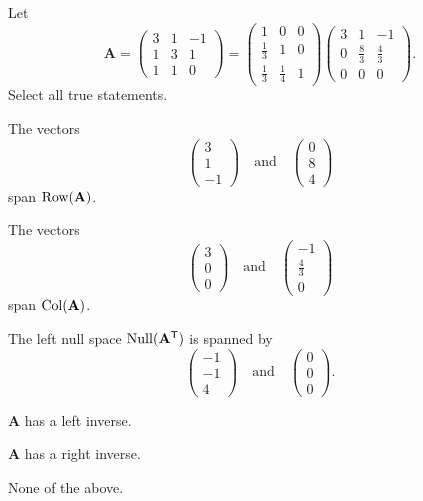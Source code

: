 \begin{problem}
Let
\[
\mathbf A=
\begin{pmatrix}
3&1&-1\\
1&3&1\\
1&1&0
\end{pmatrix}
=
\begin{pmatrix}
1&0&0\\
\frac13&1&0\\
\frac13&\frac14&1
\end{pmatrix}
\begin{pmatrix}
3&1&-1\\
0&\frac83&\frac43\\
0&0&0
\end{pmatrix}.
\]
Select all true statements.
\begin{problemchoices}
\item The vectors
\[
\begin{pmatrix}3\\1\\-1\end{pmatrix}
\quad\text{and}\quad
\begin{pmatrix}0\\8\\4\end{pmatrix}
\]
span $\operatorname{Row}(\mathbf A)$.
\item The vectors
\[
\begin{pmatrix}3\\0\\0\end{pmatrix}
\quad\text{and}\quad
\begin{pmatrix}-1\\\frac43\\0\end{pmatrix}
\]
span $\operatorname{Col}(\mathbf A)$.
\item The left null space $\operatorname{Null}(\mathbf A^{\mathsf T})$ is spanned by
\[
\begin{pmatrix}-1\\-1\\4\end{pmatrix}
\quad\text{and}\quad
\begin{pmatrix}0\\0\\0\end{pmatrix}.
\]
\item $\mathbf A$ has a left inverse.
\item $\mathbf A$ has a right inverse.
\item None of the above.
\end{problemchoices}
\end{problem}

